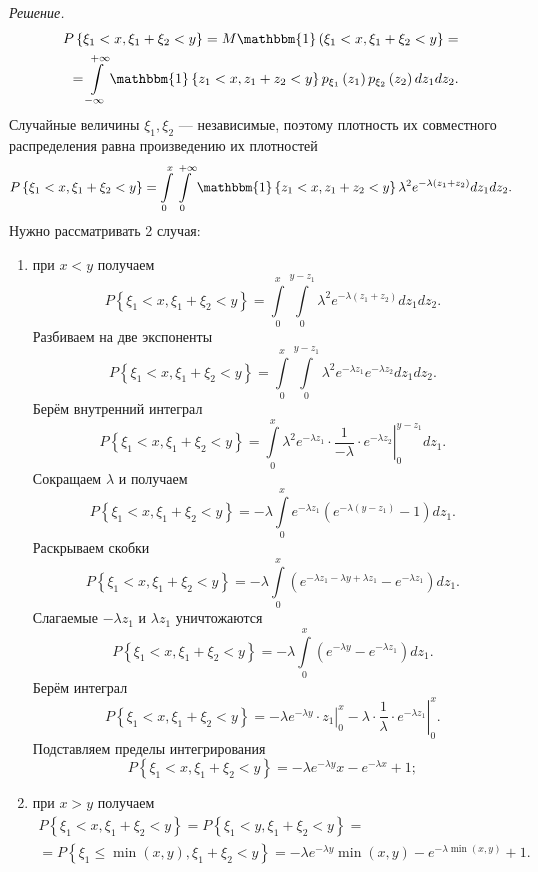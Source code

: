\textit{Решение.}
\begin{equation*}
\begin{split}
P \left\{ \xi_1 < x, \xi_1 + \xi_2 < y \right\} =
M \mathbbm{1} \left( \xi_1 < x, \xi_1 + \xi_2 < y \right\} = \\
= \int \limits_{- \infty }^{+ \infty } \mathbbm{1} \left\{ z_1 < x, z_1 + z_2 < y \right\} p_{ \xi_1} \left( z_1 \right) p_{ \xi_2} \left( z_2 \right) dz_1 dz_2.
\end{split}
\end{equation*}
Случайные величины $ \xi_1, \xi_2$ --- независимые, поэтому плотность их совместного распределения равна произведению их плотностей
$$P \left\{ \xi_1 < x, \xi_1 + \xi_2 < y \right\} =
\int \limits_0^x \int \limits_0^{+ \infty } \mathbbm{1} \left\{ z_1 < x, z_1 + z_2 < y \right\} \lambda^2 e^{- \lambda \left( z_1 + z_2 \right) } dz_1 dz_2.$$
Нужно рассматривать 2 случая:
\begin{enumerate}
\item при $x < y$ получаем
$$P \left\{ \xi_1 < x, \xi_1 + \xi_2 < y \right\} =
\int \limits_0^x \int \limits_0^{y - z_1} \lambda^2 e^{- \lambda \left( z_1 + z_2 \right) } dz_1 dz_2.$$
Разбиваем на две экспоненты
$$P \left\{ \xi_1 < x, \xi_1 + \xi_2 < y \right\} =
\int \limits_0^x \int \limits_0^{y-z_1} \lambda^2 e^{- \lambda z_1} e^{- \lambda z_2} dz_1 dz_2.$$
Берём внутренний интеграл
$$P \left\{ \xi_1 < x, \xi_1 + \xi_2 < y \right\} =
\int \limits_0^x \left. \lambda^2 e^{- \lambda z_1} \cdot \frac{1}{- \lambda } \cdot e^{- \lambda z_2} \right|_0^{y-z_1} dz_1.$$
Сокращаем $ \lambda $ и получаем
$$P \left\{ \xi_1 < x, \xi_1 + \xi_2 < y \right\} =
- \lambda \int \limits_0^x e^{- \lambda z_1} \left( e^{- \lambda \left( y-z_1 \right) } - 1 \right) dz_1.$$
Раскрываем скобки
$$P \left\{ \xi_1 < x, \xi_1 + \xi_2 < y \right\} =
- \lambda \int \limits_0^x \left( e^{- \lambda z_1 - \lambda y + \lambda z_1} - e^{- \lambda z_1} \right) dz_1.$$
Слагаемые $- \lambda z_1$ и $ \lambda z_1$ уничтожаются
$$P \left\{ \xi_1 < x, \xi_1 + \xi_2 < y \right\} =
- \lambda \int \limits_0^x \left( e^{- \lambda y} - e^{- \lambda z_1} \right) dz_1.$$
Берём интеграл
$$P \left\{ \xi_1 < x, \xi_1 + \xi_2 < y \right\} =
\left. - \lambda e^{- \lambda y} \cdot z_1 \right|_0^x - \left. \lambda \cdot \frac{1}{ \lambda } \cdot e^{- \lambda z_1} \right|_0^x.$$
Подставляем пределы интегрирования
$$P \left\{ \xi_1 < x, \xi_1 + \xi_2 < y \right\} =
- \lambda e^{- \lambda y} x - e^{- \lambda x} + 1;$$
\item при $x > y$ получаем
\begin{equation*}
\begin{split}
P \left\{ \xi_1 < x, \xi_1 + \xi_2 < y \right\} =
P \left\{ \xi_1 < y, \xi_1 + \xi_2 < y \right\} = \\
= P \left\{ \xi_1 \leq \min \left( x, y \right), \xi_1 + \xi_2 < y \right\} =
- \lambda e^{- \lambda y} \min \left( x, y \right) - e^{- \lambda \min \left( x, y \right) } + 1.
\end{split}
\end{equation*}
\end{enumerate}

